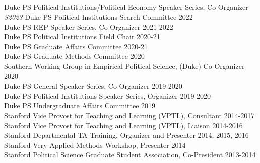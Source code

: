 \documentclass[11pt]{article}
\begin{document}

\vspace{.3in}
\begin{minipage}[t]{.21\textwidth}
	 \\
	 \\
	 \\
	 \\
\end{minipage}
\begin{minipage}[t]{.79\textwidth}
	 Duke PS Political Institutions/Political Economy Speaker Series, Co-Organizer \hfill \emph{S2023}
	 Duke PS Political Institutions Search Committee \hfill 2022 \\
	 Duke PS REP Speaker Series, Co-Organizer \hfill 2021-2022 \\
	 Duke PS Political Institutions Field Chair \hfill 2020-21 \\
	 Duke PS Graduate Affairs Committee \hfill 2020-21 \\
	 Duke PS Graduate Methods Committee \hfill 2020 \\
	 Southern Working Group in Empirical Political Science, (Duke) Co-Organizer \hfill 2020 \\
   Duke PS General Speaker Series, Co-Organizer \hfill 2019-2020 \\
	 Duke PS Political Institutions Speaker Series, Organizer \hfill 2019-2020 \\
	 Duke PS Undergraduate Affairs Committee \hfill 2019 \\

	\vspace{-.1in}
	Stanford Vice Provost for Teaching and Learning (VPTL), Consultant 			\hfill 2014-2017 \\
	Stanford Vice Provost for Teaching and Learning (VPTL), Liaison 				\hfill 2014-2016 \\
	Stanford Departmental TA Training, Organizer and Presenter		 				\hfill 2014, 2015, 2016 \\
	Stanford Very Applied Methods Workshop, Presenter 							\hfill 2014 \\
	Stanford Political Science Graduate Student Association, Co-President 			\hfill 2013-2014\\
\end{minipage}
\end{document}
